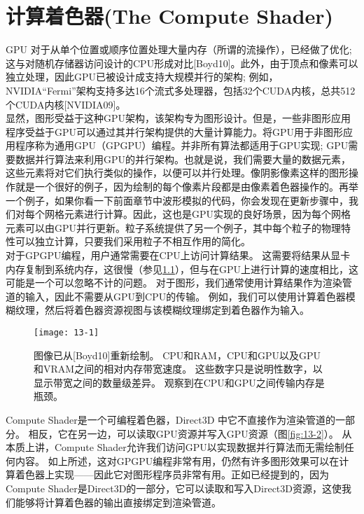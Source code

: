 \chapter{计算着色器(The Compute Shader)}
\begin{flushleft}
GPU 对于从单个位置或顺序位置处理大量内存（所谓的流操作），已经做了优化; 这与对随机存储器访问设计的CPU形成对比[Boyd10]。此外，由于顶点和像素可以独立处理，因此GPU已被设计成支持大规模并行的架构; 例如，NVIDIA“Fermi”架构支持多达16个流式多处理器，包括32个CUDA内核，总共512个CUDA内核[NVIDIA09]。\\

显然，图形受益于这种GPU架构，该架构专为图形设计。但是，一些非图形应用程序受益于GPU可以通过其并行架构提供的大量计算能力。将GPU用于非图形应用程序称为通用GPU（GPGPU）编程。并非所有算法都适用于GPU实现; GPU需要数据并行算法来利用GPU的并行架构。也就是说，我们需要大量的数据元素，这些元素将对它们执行类似的操作，以便可以并行处理。像阴影像素这样的图形操作就是一个很好的例子，因为绘制的每个像素片段都是由像素着色器操作的。再举一个例子，如果你看一下前面章节中波形模拟的代码，你会发现在更新步骤中，我们对每个网格元素进行计算。因此，这也是GPU实现的良好场景，因为每个网格元素可以由GPU并行更新。粒子系统提供了另一个例子，其中每个粒子的物理特性可以独立计算，只要我们采用粒子不相互作用的简化。\\

对于GPGPU编程，用户通常需要在CPU上访问计算结果。 这需要将结果从显卡内存复制到系统内存，这很慢（参见\ref{fig:13-1}），但与在GPU上进行计算的速度相比，这可能是一个可以忽略不计的问题。 对于图形，我们通常使用计算结果作为渲染管道的输入，因此不需要从GPU到CPU的传输。 例如，我们可以使用计算着色器模糊纹理，然后将着色器资源视图与该模糊纹理绑定到着色器作为输入。\\
\end{flushleft}

\begin{figure}[h]
    \texttt{[image: 13-1]}
    \centering
    \caption{图像已从[Boyd10]重新绘制。 CPU和RAM，CPU和GPU以及GPU和VRAM之间的相对内存带宽速度。 这些数字只是说明性数字，以显示带宽之间的数量级差异。 观察到在CPU和GPU之间传输内存是瓶颈。}
    \label{fig:13-1}
\end{figure}

\begin{flushleft}
Compute Shader是一个可编程着色器，Direct3D 中它不直接作为渲染管道的一部分。 相反，它在另一边，可以读取GPU资源并写入GPU资源（图\ref{fig:13-2}）。 从本质上讲，Compute Shader允许我们访问GPU以实现数据并行算法而无需绘制任何内容。 如上所述，这对GPGPU编程非常有用，仍然有许多图形效果可以在计算着色器上实现——因此它对图形程序员非常有用。正如已经提到的，因为Compute Shader是Direct3D的一部分，它可以读取和写入Direct3D资源，这使我们能够将计算着色器的输出直接绑定到渲染管道。\\
\end{flushleft}

